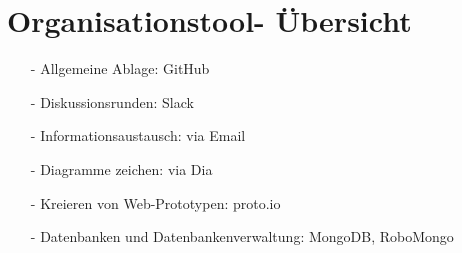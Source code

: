\documentclass[12pt,a4paper]{article}
\begin{document}
\section*{Organisationstool- Übersicht}
\begin{itemize}
\item[-]Allgemeine Ablage: GitHub
\item[-]Diskussionsrunden: Slack
\item[-]Informationsaustausch: via Email
\item[-]Diagramme zeichen: via Dia 
\item[-]Kreieren von Web-Prototypen: proto.io
\item[-]Datenbanken und Datenbankenverwaltung: MongoDB, RoboMongo
\end{itemize}
\end{document}
